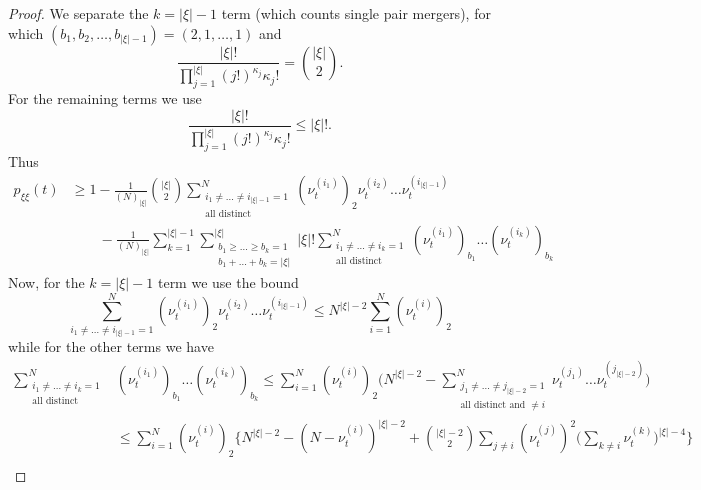 \begin{proof}
We separate the $k=|\xi|-1$ term (which counts single pair mergers), for which $(b_1, b_2, \dots, b_{|\xi|-1}) = (2,1,\dots,1)$ and
\begin{equation*}
\frac{ | \xi |! }{ \prod_{ j = 1 }^{ | \xi | } ( j ! )^{ \kappa_j } \kappa_j ! }
= \binom{|\xi|}{2} .
\end{equation*}
For the remaining terms we use
\begin{equation*}
\frac{ | \xi |! }{ \prod_{ j = 1 }^{ | \xi | } ( j ! )^{ \kappa_j } \kappa_j ! }
\leq |\xi|! .
\end{equation*}
Thus
\begin{align*}
p_{ \xi \xi }( t ) 
&\geq 1 - \frac{ 1 }{ ( N )_{ | \xi | } } \binom{|\xi|}{2}
        \sum_{ \substack{ i_1 \neq \ldots \neq i_{|\xi|-1} = 1 \\ \text{all distinct} } }^N 
        ( \nu_t^{ ( i_1 ) } )_2 \nu_t^{(i_2)} \ldots \nu_t^{ ( i_{|\xi|-1} ) } \\
    &\qquad- \frac{ 1 }{ ( N )_{ | \xi | } } \sum_{ k = 1 }^{ | \xi | - 1 } 
        \sum_{ \substack{ b_1 \geq \ldots \geq b_k = 1 
        \\ b_1 + \ldots + b_k = | \xi | } }^{ | \xi | } |\xi|!
        \sum_{ \substack{ i_1 \neq \ldots \neq i_k = 1 \\ \text{all distinct} } }^N 
        ( \nu_t^{ ( i_1 ) } )_{ b_1 } \ldots ( \nu_t^{ ( i_k ) } )_{ b_k }
\end{align*}
Now, for the $k=|\xi|-1$ term we use the bound
\begin{equation*}
\sum_{ i_1 \neq \ldots \neq i_{ | \xi | - 1 } = 1 }^N 
        ( \nu_t^{ ( i_1 ) } )_2 \nu_t^{ ( i_2 ) } \ldots \nu_t^{ ( i_{ | \xi | - 1 } ) }
\leq N^{ | \xi | - 2 } \sum_{ i = 1 }^N ( \nu_t^{ ( i ) } )_2
\end{equation*}
while for the other terms we have \parencite[similarly to][Lemma 1 Case 3]{koskela2018}
\begin{align*}
\sum_{ \substack{ i_1 \neq \ldots \neq i_k = 1 \\ \text{all distinct} } }^N &( \nu_t^{ ( i_1 ) } )_{ b_1 } \ldots ( \nu_t^{ ( i_k ) } )_{ b_k } \leq \sum_{ i = 1 }^N ( \nu_t^{ ( i ) } )_2 \Bigg( N^{ | \xi | - 2 } - \sum_{ \substack{ j_1 \neq \ldots \neq j_{ | \xi | - 2 } = 1 \\ \text{all distinct and } \neq i } }^N \nu_t^{ ( j_1 ) } \ldots \nu_t^{ ( j_{ | \xi | - 2 } ) } \Bigg) \\
&\leq \sum_{ i = 1 }^N ( \nu_t^{ ( i ) } )_2 \Bigg\{ N^{ | \xi | - 2 } - ( N - \nu_t^{ ( i ) } )^{ | \xi | - 2 } + \binom{ | \xi | - 2 }{ 2 } \sum_{ j \neq i } ( \nu_t^{ ( j ) } )^2 \Bigg( \sum_{ k \neq i } \nu_t^{ ( k ) } \Bigg)^{ | \xi | - 4 } \Bigg\} \\

\end{align*}
\end{proof}

